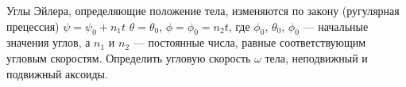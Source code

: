 Углы Эйлера, определяющие положение тела, изменяются по закону (ругулярная прецессия) $\psi=\psi_{0}+n_{1}t$ $\theta=\theta_{0}$,
$\phi=\phi_{0}=n_{2}t$, где $\phi_{0}$, $\theta_{0}$, $\phi_{0}$ --- начальные значения углов, а $n_{1}$ и $n_{2}$ --- постоянные
числа, равные соответствующим угловым скоростям. Определить угловую скорость $\omega$ тела, неподвижный и подвижный аксоиды.

